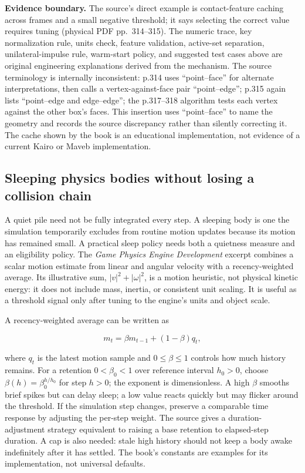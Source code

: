 \textbf{Evidence boundary.} The source's direct example is contact-feature caching across frames and a small negative threshold; it says selecting the correct value requires tuning (physical PDF pp.~314--315). The numeric trace, key normalization rule, units check, feature validation, active-set separation, unilateral-impulse rule, warm-start policy, and suggested test cases above are original engineering explanations derived from the mechanism. The source terminology is internally inconsistent: p.314 uses ``point--face'' for alternate interpretations, then calls a vertex-against-face pair ``point--edge''; p.315 again lists ``point--edge and edge--edge''; the p.317--318 algorithm tests each vertex against the other box's faces. This insertion uses ``point--face'' to name the geometry and records the source discrepancy rather than silently correcting it. The cache shown by the book is an educational implementation, not evidence of a current Kairo or Maveb implementation.

\subsection{Sleeping physics bodies without losing a collision chain}\label{06-engine-ii-ch033-sleeping-physics-bodies-without-losing-a-collision-chain}

A quiet pile need not be fully integrated every step. A sleeping body is one the simulation temporarily excludes from routine motion updates because its motion has remained small. A practical sleep policy needs both a quietness measure and an eligibility policy. The \emph{Game Physics Engine Development} excerpt combines a scalar motion estimate from linear and angular velocity with a recency-weighted average. Its illustrative sum, \(|v|^2 + |\omega|^2\), is a motion heuristic, not physical kinetic energy: it does not include mass, inertia, or consistent unit scaling. It is useful as a threshold signal only after tuning to the engine's units and object scale.

A recency-weighted average can be written as

\[m_t = \beta m_{t-1} + (1-\beta)q_t,\]

where \(q_t\) is the latest motion sample and \(0\leq\beta\leq1\) controls how much history remains. For a retention \(0<\beta_0<1\) over reference interval \(h_0>0\), choose \(\beta(h)=\beta_0^{h/h_0}\) for step \(h>0\); the exponent is dimensionless. A high \(\beta\) smooths brief spikes but can delay sleep; a low value reacts quickly but may flicker around the threshold. If the simulation step changes, preserve a comparable time response by adjusting the per-step weight. The source gives a duration-adjustment strategy equivalent to raising a base retention to elapsed-step duration. A cap is also needed: stale high history should not keep a body awake indefinitely after it has settled. The book's constants are examples for its implementation, not universal defaults.


